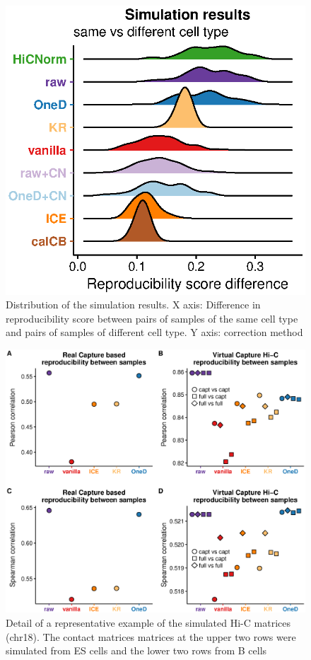 \documentclass[12pt]{report}
\begin{document}
\begin{figure}
	\centerline{\includegraphics[width=\textwidth]{nar_figures/supp_figure_12.eps}}
    \caption{
    Distribution of the simulation results. X axis: Difference in
    reproducibility score between pairs of samples of the same cell type and
    pairs of samples of different cell type. Y axis: correction method}
\end{figure}

\begin{figure}
	\centerline{\includegraphics[width=\textwidth]{nar_figures/supp_figure_13.eps}}
    \caption{
    Detail of a representative example of the simulated Hi-C matrices (chr18).
    The contact matrices matrices at the upper two rows were simulated from ES
    cells and the lower two rows from B cells}
\end{figure}
\end{document}
